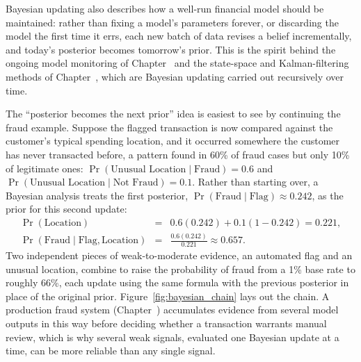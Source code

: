 \documentclass[../ai_in_finance]{subfiles}
\begin{document}
Bayesian updating also describes how a well-run financial model should be maintained: rather than fixing a model's parameters forever, or discarding the model the first time it errs, each new batch of data revises a belief incrementally, and today's posterior becomes tomorrow's prior. This is the spirit behind the ongoing model monitoring of Chapter~ and the state-space and Kalman-filtering methods of Chapter~, which are Bayesian updating carried out recursively over time.

The ``posterior becomes the next prior'' idea is easiest to see by continuing the fraud example. Suppose the flagged transaction is now compared against the customer's typical spending location, and it occurred somewhere the customer has never transacted before, a pattern found in 60\% of fraud cases but only 10\% of legitimate ones: $\Pr(\text{Unusual Location}\mid\text{Fraud}) = 0.6$ and $\Pr(\text{Unusual Location}\mid\text{Not Fraud}) = 0.1$. Rather than starting over, a Bayesian analysis treats the first posterior, $\Pr(\text{Fraud}\mid\text{Flag}) \approx 0.242$, as the prior for this second update:
\begin{eqnarray*}
\Pr(\text{Location}) &=& 0.6(0.242) + 0.1(1-0.242) = 0.221, \\
\Pr(\text{Fraud}\mid\text{Flag},\text{Location}) &=& \frac{0.6(0.242)}{0.221} \approx 0.657.
\end{eqnarray*}
Two independent pieces of weak-to-moderate evidence, an automated flag and an unusual location, combine to raise the probability of fraud from a 1\% base rate to roughly 66\%, each update using the same formula with the previous posterior in place of the original prior. Figure~\ref{fig:bayesian_chain} lays out the chain. A production fraud system (Chapter~) accumulates evidence from several model outputs in this way before deciding whether a transaction warrants manual review, which is why several weak signals, evaluated one Bayesian update at a time, can be more reliable than any single signal.
\end{document}
